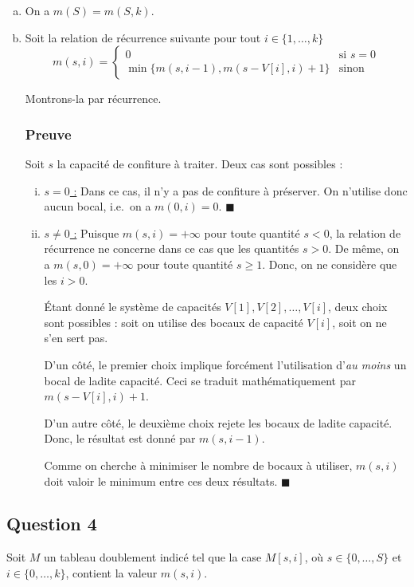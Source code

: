 \documentclass[12pt,a4paper]{article}
\begin{document}
\begin{enumerate}[a)]
\item On a \( m(S) = m(S,k)\).

\item Soit la relation de r\'ecurrence suivante pour tout $ i \in \{1,\dotsc,k\} $
\[
m(s,i) = 
\begin{cases}
0 & \text{si } s = 0 \\
\min \{m(s,i-1),m(s-V[i],i)+1\} & \text{sinon}
\end{cases}
\]

Montrons-la par r\'ecurrence.

\subsubsection*{Preuve}
Soit $s$ la capacit\'e de confiture \`a traiter. Deux cas sont possibles :
\begin{enumerate}[i)]
 \item \underline{$s = 0$ :} Dans ce cas, il n'y a pas de confiture \`a pr\'eserver. On n'utilise donc aucun bocal, i.e.\ on a $m(0,i) = 0$. \hfill\ensuremath{\blacksquare}
 \item \underline{$s \neq 0$ :} Puisque $m(s,i) = +\infty$ pour toute quantit\'e $s < 0$, la relation de r\'ecurrence ne concerne dans ce cas que les quantit\'es $s > 0$. De m\^eme, on a $m(s,0) = +\infty$ pour toute quantit\'e $s \geq 1$. Donc, on ne consid\`ere que les $i > 0$.
 
\'Etant donn\'e le syst\`eme de capacit\'es $V[1], V[2], \dotsc, V[i]$, deux choix sont possibles : soit on utilise des bocaux de capacit\'e $V[i]$, soit on ne s'en sert pas. 

D'un c\^ot\'e, le premier choix implique forc\'ement l'utilisation d'{\itshape au moins} un bocal de ladite capacit\'e. Ceci se traduit math\'ematiquement par $m(s-V[i],i)+1$. 

D'un autre c\^ot\'e, le deuxi\`eme choix rejete les bocaux de ladite capacit\'e. Donc, le r\'esultat est donn\'e par $m(s,i-1)$.

Comme on cherche \`a minimiser le nombre de bocaux \`a utiliser, $m(s,i)$ doit valoir le minimum entre ces deux r\'esultats. \hfill\ensuremath{\blacksquare}
\end{enumerate}
\end{enumerate}

\subsection*{Question 4}
Soit $M$ un tableau doublement indic\'e tel que la case $M[s,i]$, o\`u $s \in \{0,\dotsc,S\}$ et $i \in \{0,\dotsc,k\}$, contient la valeur $m(s,i)$.
\end{document}
